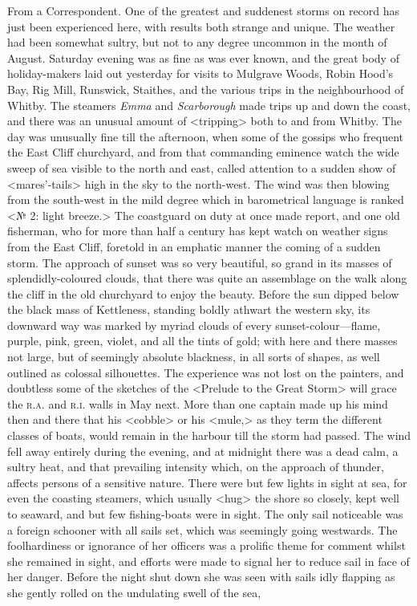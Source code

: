 \begin{newspaper}{}{From a Correspondent.}
One of the greatest and suddenest storms on record has just been experienced here, with results both strange and unique. The weather had been somewhat sultry, but not to any degree uncommon in the month of August. Saturday evening was as fine as was ever known, and the great body of holiday-makers laid out yesterday for visits to Mulgrave Woods, Robin Hood's Bay, Rig Mill, Runswick, Staithes, and the various trips in the neighbourhood of Whitby. The steamers \textit{Emma} and \textit{Scarborough} made trips up and down the coast, and there was an unusual amount of <tripping> both to and from Whitby. The day was unusually fine till the afternoon, when some of the gossips who frequent the East Cliff churchyard, and from that commanding eminence watch the wide sweep of sea visible to the north and east, called attention to a sudden show of <mares'-tails> high in the sky to the north-west. The wind was then blowing from the south-west in the mild degree which in barometrical language is ranked <№ 2: light breeze.> The coastguard on duty at once made report, and one old fisherman, who for more than half a century has kept watch on weather signs from the East Cliff, foretold in an emphatic manner the coming of a sudden storm. The approach of sunset was so very beautiful, so grand in its masses of splendidly-coloured clouds, that there was quite an assemblage on the walk along the cliff in the old churchyard to enjoy the beauty. Before the sun dipped below the black mass of Kettleness, standing boldly athwart the western sky, its downward way was marked by myriad clouds of every sunset-colour—flame, purple, pink, green, violet, and all the tints of gold; with here and there masses not large, but of seemingly absolute blackness, in all sorts of shapes, as well outlined as colossal silhouettes. The experience was not lost on the painters, and doubtless some of the sketches of the <Prelude to the Great Storm> will grace the \textsc{r.a.} and \textsc{r.i.} walls in May next. More than one captain made up his mind then and there that his <cobble> or his <mule,> as they term the different classes of boats, would remain in the harbour till the storm had passed. The wind fell away entirely during the evening, and at midnight there was a dead calm, a sultry heat, and that prevailing intensity which, on the approach of thunder, affects persons of a sensitive nature. There were but few lights in sight at sea, for even the coasting steamers, which usually <hug> the shore so closely, kept well to seaward, and but few fishing-boats were in sight. The only sail noticeable was a foreign schooner with all sails set, which was seemingly going westwards. The foolhardiness or ignorance of her officers was a prolific theme for comment whilst she remained in sight, and efforts were made to signal her to reduce sail in face of her danger. Before the night shut down she was seen with sails idly flapping as she gently rolled on the undulating swell of the sea,


\end{newspaper}
